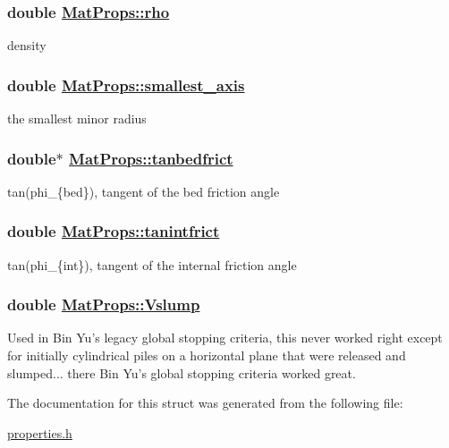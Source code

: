 \hypertarget{structMatProps_o10}{
\subsubsection[rho]{\setlength{\rightskip}{0pt plus 5cm}double \hyperlink{structMatProps_o10}{Mat\-Props::rho}}}
\label{structMatProps_o10}


density 

\hypertarget{structMatProps_o1}{
\subsubsection[smallest\_\-axis]{\setlength{\rightskip}{0pt plus 5cm}double \hyperlink{structMatProps_o1}{Mat\-Props::smallest\_\-axis}}}
\label{structMatProps_o1}


the smallest minor radius 

\hypertarget{structMatProps_o7}{
\subsubsection[tanbedfrict]{\setlength{\rightskip}{0pt plus 5cm}double$\ast$ \hyperlink{structMatProps_o7}{Mat\-Props::tanbedfrict}}}
\label{structMatProps_o7}


tan(phi\_\-\{bed\}), tangent of the bed friction angle 

\hypertarget{structMatProps_o5}{
\subsubsection[tanintfrict]{\setlength{\rightskip}{0pt plus 5cm}double \hyperlink{structMatProps_o5}{Mat\-Props::tanintfrict}}}
\label{structMatProps_o5}


tan(phi\_\-\{int\}), tangent of the internal friction angle 

\hypertarget{structMatProps_o17}{
\subsubsection[Vslump]{\setlength{\rightskip}{0pt plus 5cm}double \hyperlink{structMatProps_o17}{Mat\-Props::Vslump}}}
\label{structMatProps_o17}


Used in Bin Yu's legacy global stopping criteria, this never worked right except for initially cylindrical piles on a horizontal plane that were released and slumped... there Bin Yu's global stopping criteria worked great. 



The documentation for this struct was generated from the following file:\begin{CompactItemize}
\item 
\hyperlink{properties_8h}{properties.h}\end{CompactItemize}
